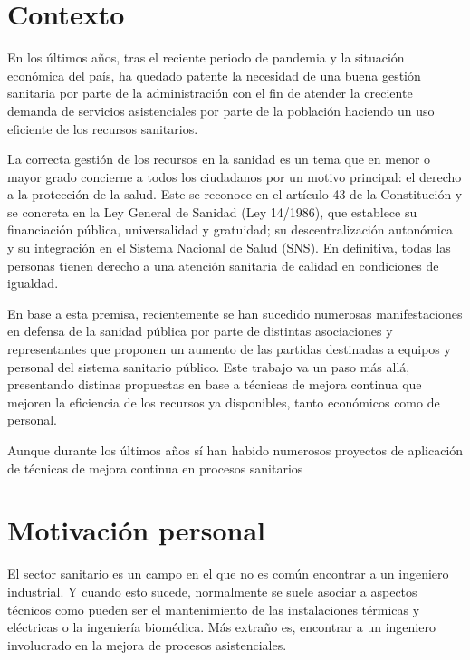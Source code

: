 \section{Contexto}

En los últimos años, tras el reciente periodo de pandemia y la situación económica del país, ha quedado patente la necesidad de una buena gestión sanitaria por parte de la administración con el fin de atender la creciente demanda de servicios asistenciales por parte de la población haciendo un uso eficiente de los recursos sanitarios.

La correcta gestión de los recursos en la sanidad es un tema que en menor o mayor grado concierne a todos los ciudadanos por un motivo principal: el derecho a la protección de la salud. Este se reconoce en el artículo 43 de la Constitución y se concreta en la Ley General de Sanidad (Ley 14/1986), que establece su financiación pública, universalidad y gratuidad; su descentralización autonómica y su integración en el Sistema Nacional de Salud (SNS). En definitiva, todas las personas tienen derecho a una atención sanitaria de calidad en condiciones de igualdad.

En base a esta premisa, recientemente se han sucedido numerosas manifestaciones en defensa de la sanidad pública por parte de distintas asociaciones y representantes que proponen un aumento de las partidas destinadas a equipos y personal del sistema sanitario público. Este trabajo va un paso más allá, presentando distinas propuestas en base a técnicas de mejora continua que mejoren la eficiencia de los recursos ya disponibles, tanto económicos como de personal.


Aunque durante los últimos años sí han habido numerosos proyectos de aplicación de técnicas de mejora continua en procesos sanitarios \parencite{davila_mejora_2015}

\section{Motivación personal}

El sector sanitario es un campo en el que no es común encontrar a un ingeniero industrial. Y cuando esto sucede, normalmente se suele asociar a aspectos técnicos como pueden ser el mantenimiento de las instalaciones térmicas y eléctricas o la ingeniería biomédica. Más extraño es, encontrar a un ingeniero involucrado en la mejora de procesos asistenciales.

